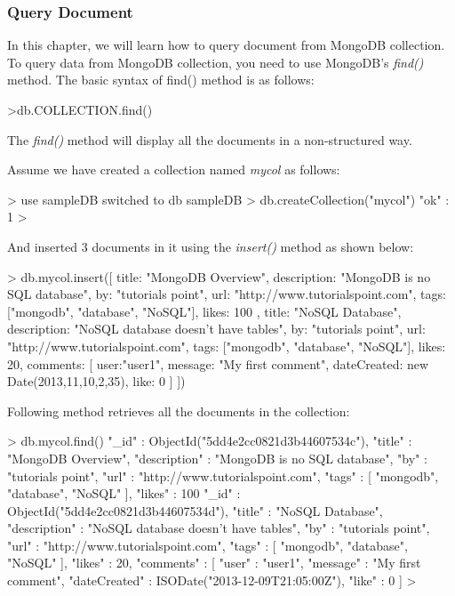 \documentclass[12pt]{article}
\begin{document}
\newpage
\subsubsection{Query Document}

In this chapter, we will learn how to query document from MongoDB collection.
To query data from MongoDB collection, you need to use MongoDB's
\emph{find()} method. The basic syntax of find() method is as follows:

\begin{bashcode}
>db.COLLECTION.find()
\end{bashcode}

The \emph{find()} method will display all the documents in a non-structured way.

Assume we have created a collection named \emph{mycol} as follows:

\begin{bashcode}
> use sampleDB
switched to db sampleDB
> db.createCollection("mycol")
{ "ok" : 1 }
>
\end{bashcode}

And inserted 3 documents in it using the \emph{insert()} method as shown
below:

\begin{bashcode}
> db.mycol.insert([
    {
        title: "MongoDB Overview",
        description: "MongoDB is no SQL database",
        by: "tutorials point",
        url: "http://www.tutorialspoint.com",
        tags: ["mongodb", "database", "NoSQL"],
        likes: 100
    },
    {
        title: "NoSQL Database",
        description: "NoSQL database doesn't have tables",
        by: "tutorials point",
        url: "http://www.tutorialspoint.com",
        tags: ["mongodb", "database", "NoSQL"],
        likes: 20,
        comments: [
            {
                user:"user1",
                message: "My first comment",
                dateCreated: new Date(2013,11,10,2,35),
                like: 0
            }
        ]
    }
])
\end{bashcode}

Following method retrieves all the documents in the collection:

\begin{bashcode}
> db.mycol.find()
{ "_id" : ObjectId("5dd4e2cc0821d3b44607534c"), "title" : "MongoDB Overview", "description" : "MongoDB is no SQL database", "by" : "tutorials point", "url" : "http://www.tutorialspoint.com", "tags" : [ "mongodb", "database", "NoSQL" ], "likes" : 100 }
{ "_id" : ObjectId("5dd4e2cc0821d3b44607534d"), "title" : "NoSQL Database", "description" : "NoSQL database doesn't have tables", "by" : "tutorials point", "url" : "http://www.tutorialspoint.com", "tags" : [ "mongodb", "database", "NoSQL" ], "likes" : 20, "comments" : [ { "user" : "user1", "message" : "My first comment", "dateCreated" : ISODate("2013-12-09T21:05:00Z"), "like" : 0 } ] }
>
\end{bashcode}
\end{document}
